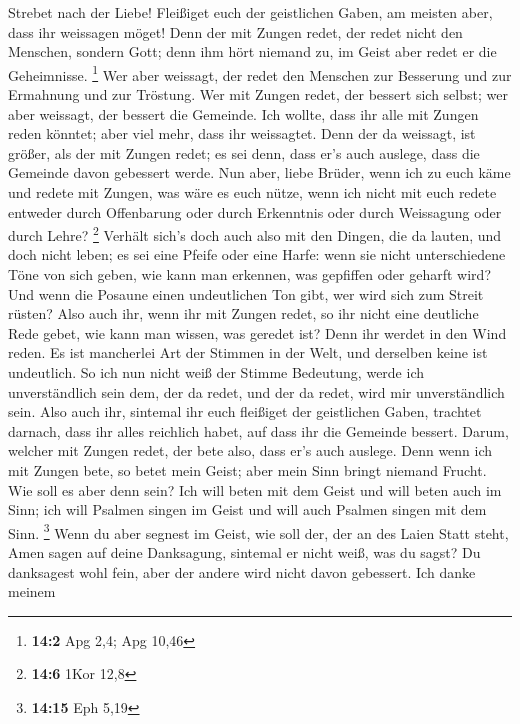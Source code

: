  Strebet nach der Liebe! Fleißiget euch der geistlichen
Gaben, am meisten aber, dass ihr weissagen möget!  Denn
der mit Zungen redet, der redet nicht den Menschen, sondern Gott; denn
ihm hört niemand zu, im Geist aber redet er die Geheimnisse. \footnote{\textbf{14:2}
  Apg 2,4; Apg 10,46}  Wer aber weissagt, der redet den
Menschen zur Besserung und zur Ermahnung und zur Tröstung.
 Wer mit Zungen redet, der bessert sich selbst; wer aber
weissagt, der bessert die Gemeinde.  Ich wollte, dass ihr
alle mit Zungen reden könntet; aber viel mehr, dass ihr weissagtet. Denn
der da weissagt, ist größer, als der mit Zungen redet; es sei denn, dass
er's auch auslege, dass die Gemeinde davon gebessert werde.
 Nun aber, liebe Brüder, wenn ich zu euch käme und redete
mit Zungen, was wäre es euch nütze, wenn ich nicht mit euch redete
entweder durch Offenbarung oder durch Erkenntnis oder durch Weissagung
oder durch Lehre? \footnote{\textbf{14:6} 1Kor 12,8} 
Verhält sich's doch auch also mit den Dingen, die da lauten, und doch
nicht leben; es sei eine Pfeife oder eine Harfe: wenn sie nicht
unterschiedene Töne von sich geben, wie kann man erkennen, was gepfiffen
oder geharft wird?  Und wenn die Posaune einen
undeutlichen Ton gibt, wer wird sich zum Streit rüsten? 
Also auch ihr, wenn ihr mit Zungen redet, so ihr nicht eine deutliche
Rede gebet, wie kann man wissen, was geredet ist? Denn ihr werdet in den
Wind reden.  Es ist mancherlei Art der Stimmen in der
Welt, und derselben keine ist undeutlich.  So ich nun
nicht weiß der Stimme Bedeutung, werde ich unverständlich sein dem, der
da redet, und der da redet, wird mir unverständlich sein.
 Also auch ihr, sintemal ihr euch fleißiget der
geistlichen Gaben, trachtet darnach, dass ihr alles reichlich habet, auf
dass ihr die Gemeinde bessert.  Darum, welcher mit Zungen
redet, der bete also, dass er's auch auslege.  Denn wenn
ich mit Zungen bete, so betet mein Geist; aber mein Sinn bringt niemand
Frucht.  Wie soll es aber denn sein? Ich will beten mit
dem Geist und will beten auch im Sinn; ich will Psalmen singen im Geist
und will auch Psalmen singen mit dem Sinn. \footnote{\textbf{14:15} Eph
  5,19}  Wenn du aber segnest im Geist, wie soll der, der
an des Laien Statt steht, Amen sagen auf deine Danksagung, sintemal er
nicht weiß, was du sagst?  Du danksagest wohl fein, aber
der andere wird nicht davon gebessert.  Ich danke meinem
